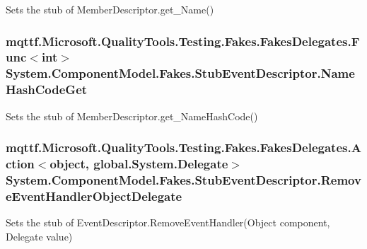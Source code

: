Sets the stub of Member\-Descriptor.\-get\-\_\-\-Name()

\hypertarget{class_system_1_1_component_model_1_1_fakes_1_1_stub_event_descriptor_aaac779619c40d79f29ec38c189e3f51f}{
\subsubsection[{Name\-Hash\-Code\-Get}]{\setlength{\rightskip}{0pt plus 5cm}mqttf.\-Microsoft.\-Quality\-Tools.\-Testing.\-Fakes.\-Fakes\-Delegates.\-Func$<$int$>$ System.\-Component\-Model.\-Fakes.\-Stub\-Event\-Descriptor.\-Name\-Hash\-Code\-Get}}\label{class_system_1_1_component_model_1_1_fakes_1_1_stub_event_descriptor_aaac779619c40d79f29ec38c189e3f51f}


Sets the stub of Member\-Descriptor.\-get\-\_\-\-Name\-Hash\-Code()

\hypertarget{class_system_1_1_component_model_1_1_fakes_1_1_stub_event_descriptor_a996d1b5ba062ca120496f05ca86ca40d}{
\subsubsection[{Remove\-Event\-Handler\-Object\-Delegate}]{\setlength{\rightskip}{0pt plus 5cm}mqttf.\-Microsoft.\-Quality\-Tools.\-Testing.\-Fakes.\-Fakes\-Delegates.\-Action$<$object, global.\-System.\-Delegate$>$ System.\-Component\-Model.\-Fakes.\-Stub\-Event\-Descriptor.\-Remove\-Event\-Handler\-Object\-Delegate}}\label{class_system_1_1_component_model_1_1_fakes_1_1_stub_event_descriptor_a996d1b5ba062ca120496f05ca86ca40d}


Sets the stub of Event\-Descriptor.\-Remove\-Event\-Handler(\-Object component, Delegate value)



